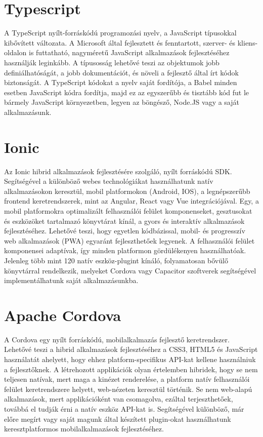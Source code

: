 \documentclass[12pt, twoside]{report}
\begin{document}
\section{Typescript}
A TypeScript nyílt-forráskódú programozási nyelv, a JavaScript típusokkal kibővített változata. A Microsoft által fejlesztett és fenntartott, szerver- és kliens-oldalon is futtatható, nagyméretű JavaScript alkalmazások fejlesztéséhez használják leginkább.
A típusosság lehetővé teszi az objektumok jobb definiálhatóságát, a jobb dokumentációt, és növeli a fejlesztő által írt kódok biztonságát.
A TypeScript kódokat a nyelv saját fordítója, a Babel minden esetben JavaScript kódra fordítja, majd ez az egyszerűbb és tisztább kód fut le bármely JavaScript környezetben, legyen az böngésző, Node.JS vagy a saját alkalmazásunk. 

\section{Ionic}
Az Ionic hibrid alkalmazások fejlesztésére szolgáló, nyílt forráskódú SDK. Segítségével a különböző webes technológiákat használhatunk natív alkalmazásokon keresztül, mobil platformokon (Android, IOS), a legnépszerűbb frontend keretrendszerek, mint az Angular, React vagy Vue integrációjával. Egy, a mobil platformokra optimalizált felhasználói felület komponenseket, gesztusokat és eszközöket tartalmazó könyvtárat kínál, a gyors és interaktív alkalmazások fejlesztéséhez. Lehetővé teszi, hogy egyetlen kódbázissal, mobil- és progresszív web alkalmazások (PWA) egyaránt fejleszthetőek legyenek. A felhasználói felület komponensei adaptívak, így minden platformon gördülékenyen használhatóak. Jelenleg több mint 120 natív eszköz-plugint kínáló, folyamatosan bővülő könyvtárral rendelkezik, melyeket Cordova vagy Capacitor szoftverek segítségével implementálhatunk saját alkalmazásunkba.

\section{Apache Cordova}
A Cordova egy nyílt forráskódú, mobilalkalmazás fejlesztő keretrendszer. Lehetővé teszi a hibrid alkalmazások fejlesztéséhez a CSS3, HTML5 és JavaScript használatát ahelyett, hogy ehhez platform-specifikus API-kat kellene használniuk a fejlesztőknek. A létrehozott applikációk olyan értelemben hibridek, hogy se nem teljesen natívak, mert maga a kinézet renderelése, a platform natív felhasználói felület keretrendszere helyett, web-nézeten keresztül történik. Se nem web-alapú alkalmazások, mert applikációként van csomagolva, ezáltal terjeszthetőek, továbbá el tudják érni a natív eszköz API-kat is.
Segítségével különböző, már előre megírt vagy saját magunk által készített plugin-okat használhatunk keresztplatformos mobilalkalmazások fejlesztéséhez.
\end{document}

